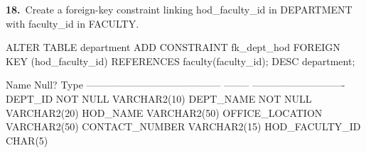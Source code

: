 
\noindent\begin{minipage}{\linewidth}
\begingroup{}
{\fontsize{14}{17}\selectfont\textbf{18.}}\ Create a foreign-key constraint linking hod\_faculty\_id in DEPARTMENT with faculty\_id in FACULTY.\par
\endgroup\vspace{12pt}


\begin{sqlcode}
ALTER TABLE department
    ADD CONSTRAINT fk_dept_hod FOREIGN KEY (hod_faculty_id)
    REFERENCES faculty(faculty_id);
DESC department;
\end{sqlcode}

\vspace{18pt}


\begin{sqlout}
 Name                                      Null?    Type
 ----------------------------------------- -------- ----------------------------
 DEPT_ID                                   NOT NULL VARCHAR2(10)
 DEPT_NAME                                 NOT NULL VARCHAR2(20)
 HOD_NAME                                           VARCHAR2(50)
 OFFICE_LOCATION                                    VARCHAR2(50)
 CONTACT_NUMBER                                     VARCHAR2(15)
 HOD_FACULTY_ID                                     CHAR(5)
\end{sqlout}
\end{minipage}\par\vspace{30pt}

